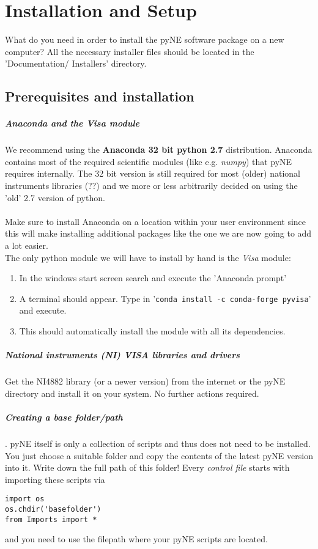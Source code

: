 %
\chapter{Installation and Setup}
What do you need in order to install the pyNE software package on a new computer? All the necessary installer files should be located in the 'Documentation/ Installers' directory.
\section{Prerequisites and installation}
\paragraph*{Anaconda and the Visa module}
We recommend using the \textbf{Anaconda 32 bit python 2.7} distribution. Anaconda contains most of the required scientific modules (like e.g. \textit{numpy}) that pyNE requires internally. The 32 bit version is still required for most (older) national instruments libraries (??) and we more or less arbitrarily decided on using the 'old' 2.7 version of python.\\
\\
Make sure to install Anaconda on a location within your user environment since this will make installing additional packages like the one we are now going to add a lot easier.\\
The only python module we will have to install by hand is the \textit{Visa} module:
\begin{enumerate}
\item In the windows start screen search and execute the 'Anaconda prompt'
\item A terminal should appear. Type in '\texttt{conda install -c conda-forge pyvisa}' and execute.
\item This should automatically install the module with all its dependencies.
\end{enumerate}
\paragraph*{National instruments (NI) VISA libraries and drivers}
Get the NI4882 library (or a newer version) from the internet or the pyNE directory and install it on your system. No further actions required.
\paragraph*{Creating a base folder/path}. pyNE itself is only a collection of scripts and thus does not need to be installed. You just choose a suitable folder and copy the contents of the latest pyNE version into it. Write down the full path of this folder! Every \textit{control file} starts with importing these scripts via
\begin{verbatim}
import os
os.chdir('basefolder')
from Imports import *
\end{verbatim}
and you need to use the filepath where your pyNE scripts are located. 
